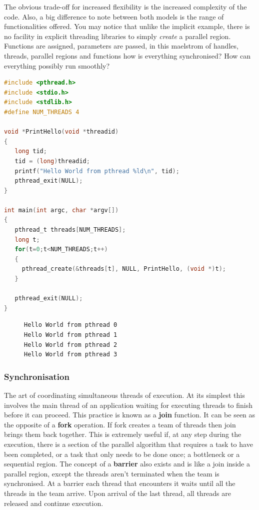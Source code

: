 \documentclass[11pt]{article} %
\begin{document}
The obvious trade-off for increased flexibility is the increased complexity of the code. Also, a big difference to note between both models is the range of functionalities offered. You may notice that unlike the implicit example, there is no facility in explicit threading libraries to simply {\it create} a parallel region. Functions are assigned, parameters are passed, in this maelstrom of handles, threads, parallel regions and functions how is everything synchronised? How can everything possibly run smoothly? 
\begin{lstlisting}[language=C, caption={Hello World from PThreads}]
#include <pthread.h>
#include <stdio.h>
#include <stdlib.h>
#define NUM_THREADS	4

void *PrintHello(void *threadid)
{
   long tid;
   tid = (long)threadid;
   printf("Hello World from pthread %ld\n", tid);
   pthread_exit(NULL);
}

int main(int argc, char *argv[])
{
   pthread_t threads[NUM_THREADS];
   long t;
   for(t=0;t<NUM_THREADS;t++)
   {
     pthread_create(&threads[t], NULL, PrintHello, (void *)t);
   }
   
   pthread_exit(NULL);
}
\end{lstlisting}
\begin{figure}
\begin{verbatim}
Hello World from pthread 0
Hello World from pthread 1
Hello World from pthread 2
Hello World from pthread 3
\end{verbatim}
\end{figure}
\subsubsection{Synchronisation}
The art of coordinating simultaneous threads of execution. At its simplest this involves the main thread of an application waiting for executing threads to finish before it can proceed. This practice is known as a {\bf join} function. It can be seen as the opposite of a {\bf fork} operation. If fork creates a team of threads then join brings them back together. This is extremely useful if, at any step during the execution, there is a section of the parallel algorithm that requires a task to have been completed, or a task that only needs to be done once; a bottleneck or a sequential region. The concept of a {\bf barrier} also exists and is like a join inside a parallel region, except the threads aren't terminated when the team is synchronised. At a barrier each thread that encounters it waits until all the threads in the team arrive. Upon arrival of the last thread, all threads are released and continue execution. \cite[p265]{ref14}
\end{document}
